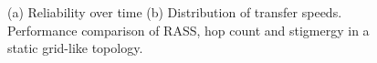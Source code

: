 \begin{figure}
    \centering
    \caption{(a) Reliability over time (b) Distribution of transfer speeds. Performance comparison of RASS, hop count and stigmergy in a static grid-like topology.}
    \label{results:staticTopology}
    \vspace{-2mm}
\end{figure}

